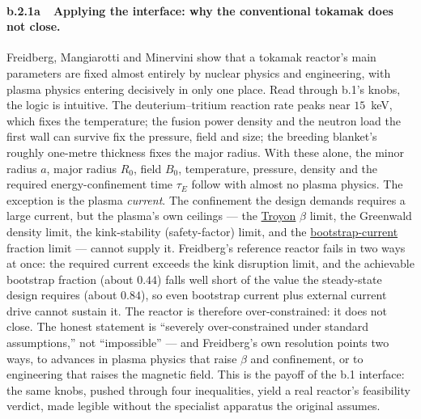 \documentclass[11pt]{article}
\newcommand{\jl}[2]{\href{#2}{#1}}
\begin{document}
\paragraph{b.2.1a~~Applying the interface: why the conventional tokamak does not close.}
Freidberg, Mangiarotti and Minervini show that a tokamak reactor's main parameters are fixed almost entirely by nuclear physics and engineering, with plasma physics entering decisively in only one place.\cite{freidberg2015} Read through b.1's knobs, the logic is intuitive. The deuterium--tritium reaction rate peaks near $15$~keV, which fixes the temperature; the fusion power density and the neutron load the first wall can survive fix the pressure, field and size; the breeding blanket's roughly one-metre thickness fixes the major radius. With these alone, the minor radius $a$, major radius $R_0$, field $B_0$, temperature, pressure, density and the required energy-confinement time $\tau_E$ follow with almost no plasma physics. The exception is the plasma \emph{current}. The confinement the design demands requires a large current, but the plasma's own ceilings --- the \jl{Troyon}{https://en.wikipedia.org/wiki/Beta_(plasma_physics)} $\beta$ limit,\cite{troyon1984} the Greenwald density limit,\cite{greenwald1988} the kink-stability (safety-factor) limit, and the \jl{bootstrap-current}{https://en.wikipedia.org/wiki/Bootstrap_current} fraction limit\cite{kikuchi1990} --- cannot supply it. Freidberg's reference reactor fails in two ways at once: the required current exceeds the kink disruption limit, and the achievable bootstrap fraction (about $0.44$) falls well short of the value the steady-state design requires (about $0.84$), so even bootstrap current plus external current drive cannot sustain it.\cite{freidberg2015} The reactor is therefore over-constrained: it does not close. The honest statement is ``severely over-constrained under standard assumptions,'' not ``impossible'' --- and Freidberg's own resolution points two ways, to advances in plasma physics that raise $\beta$ and confinement, or to engineering that raises the magnetic field.\cite{freidberg2015} This is the payoff of the b.1 interface: the same knobs, pushed through four inequalities, yield a real reactor's feasibility verdict, made legible without the specialist apparatus the original assumes.
\end{document}
